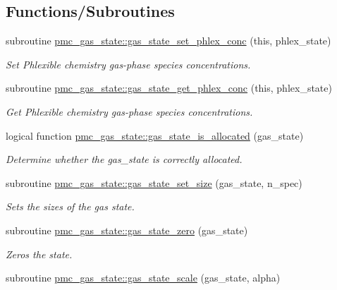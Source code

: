 \subsection*{Functions/\+Subroutines}
\begin{DoxyCompactItemize}
\item 
subroutine \mbox{\hyperlink{namespacepmc__gas__state_a4bb5e19ab85b92dac65f973abcfcc416}{pmc\+\_\+gas\+\_\+state\+::gas\+\_\+state\+\_\+set\+\_\+phlex\+\_\+conc}} (this, phlex\+\_\+state)
\begin{DoxyCompactList}\small\item\em Set Phlexible chemistry gas-\/phase species concentrations. \end{DoxyCompactList}\item 
subroutine \mbox{\hyperlink{namespacepmc__gas__state_a93dce5fa598274335861553be37d27f0}{pmc\+\_\+gas\+\_\+state\+::gas\+\_\+state\+\_\+get\+\_\+phlex\+\_\+conc}} (this, phlex\+\_\+state)
\begin{DoxyCompactList}\small\item\em Get Phlexible chemistry gas-\/phase species concentrations. \end{DoxyCompactList}\item 
logical function \mbox{\hyperlink{namespacepmc__gas__state_a589f5022a3cc8311ce829f31b8f4f641}{pmc\+\_\+gas\+\_\+state\+::gas\+\_\+state\+\_\+is\+\_\+allocated}} (gas\+\_\+state)
\begin{DoxyCompactList}\small\item\em Determine whether the {\ttfamily gas\+\_\+state} is correctly allocated. \end{DoxyCompactList}\item 
subroutine \mbox{\hyperlink{namespacepmc__gas__state_aa5f6579f91a3e4b7bfb959af9624088d}{pmc\+\_\+gas\+\_\+state\+::gas\+\_\+state\+\_\+set\+\_\+size}} (gas\+\_\+state, n\+\_\+spec)
\begin{DoxyCompactList}\small\item\em Sets the sizes of the gas state. \end{DoxyCompactList}\item 
subroutine \mbox{\hyperlink{namespacepmc__gas__state_a041688687cbca4258024f99f99c679ea}{pmc\+\_\+gas\+\_\+state\+::gas\+\_\+state\+\_\+zero}} (gas\+\_\+state)
\begin{DoxyCompactList}\small\item\em Zeros the state. \end{DoxyCompactList}\item 
subroutine \mbox{\hyperlink{namespacepmc__gas__state_ab16ebc3648f8854efd45182cfb2097ca}{pmc\+\_\+gas\+\_\+state\+::gas\+\_\+state\+\_\+scale}} (gas\+\_\+state, alpha)

\end{DoxyCompactItemize}
